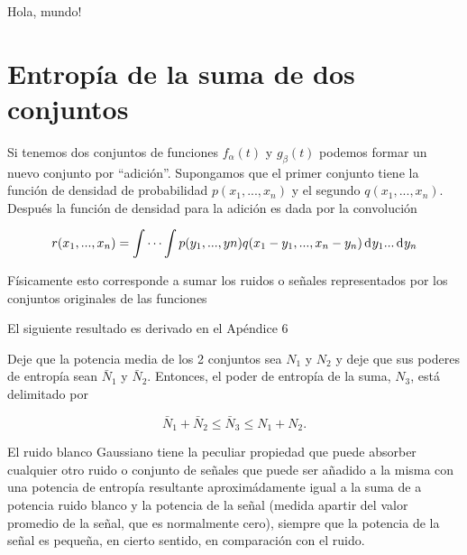 {\textexclamdown}Hola, mundo!

\section{Entrop\'ia de la suma de dos conjuntos}

	Si tenemos dos conjuntos de funciones $f_{\alpha}(t)$ y
	$g_{\beta}(t)$ podemos formar un nuevo conjunto por
	``adici\'on''. Supongamos que el primer conjunto tiene la
	funci\'on de densidad de probabilidad $p(x_{1},...,x_{n})$ y
	el segundo $q(x_{1},...,x_{n})$.  Despu\'es la funci\'on de
	densidad para la adici\'on es dada por la convoluci\'on
	
	\begin{equation} r(x_{1},...,x_{n}) = \int \cdots \int
		p(y_{1},...,y{n})q(x_{1}-y_{1},...,x_{n}-y_{n}) \diff y_{1}... \diff y_{n} \end{equation}
	
	F\'isicamente esto corresponde a sumar los ruidos o se\~nales
	representados por los conjuntos originales de las funciones
	
		
	El siguiente resultado es derivado en el Ap\'endice 6
	
    \begin{theorem} 

Deje que la potencia media de los 2 conjuntos sea $N_{1}$ y $N_{2}$ y
 deje que sus poderes de entrop\'ia sean $\bar{N}_1$ y
 $\bar{N}_2$. Entonces, el poder de entrop\'ia de la suma, $N_{3}$,
 est\'a delimitado por

\begin{equation} 
\bar{N}_1+\bar{N}_2 \le \bar{N}_3 \le N_{1} + N_{2}.
\end{equation} 
\end{theorem}
	
	El ruido blanco Gaussiano tiene la peculiar propiedad que
	puede absorber cualquier otro ruido o conjunto de se\~nales
	que puede ser a\~nadido a la misma con una potencia de
	entrop\'ia resultante aproxim\'adamente igual a la suma de a
	potencia ruido blanco y la potencia de la se\~nal (medida
	apartir del valor promedio de la se\~nal, que es normalmente
	cero), siempre que la potencia de la se\~{n}al es peque\~na,
	en cierto sentido, en comparaci\'on con el ruido.
	
